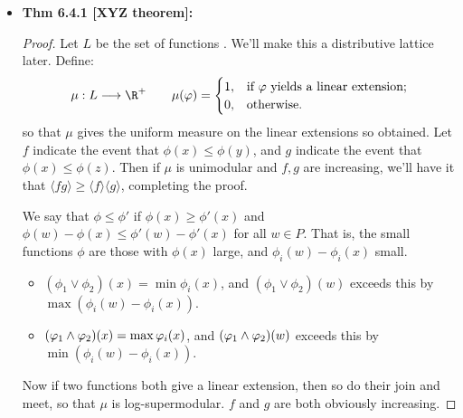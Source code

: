 \documentclass[11pt]{article}
\newenvironment{INT}[1][]{\begin{itemize}\small\item\textbf{#1}}{\end{itemize}}
\begin{document}
\begin{chapter6}
\begin{itemise}
\begin{INT}[Thm 6.4.1 {[XYZ theorem]}:]
\begin{proof}
\INDENT Let $L$ be the set of functions . We'll make this a distributive lattice later. Define:
\[\mu:L\to\R^+\qquad \mu(\phi)=\begin{cases}
1,&\textup{if $\phi$ yields a linear extension};\\
0,&\textup{otherwise}.
\end{cases}\]
so that $\mu$ gives the uniform measure on the linear extensions so obtained. Let $f$ indicate the event that $\phi(x)\leq \phi(y)$, and $g$ indicate the event that $\phi(x)\leq \phi(z)$. Then if $\mu$ is unimodular and $f,g$ are increasing, we'll have it that $\langle fg\rangle\geq\langle f\rangle\langle g\rangle$, completing the proof.

\INDENT %
We say that $\phi\leq\phi'$ if $\phi(x)\geq\phi'(x)$ and $\phi(w)-\phi(x)\leq\phi'(w)-\phi'(x)$ for all $w\in P$. That is, the small functions $\phi$ are those with $\phi(x)$ large, and $\phi_i(w)-\phi_i(x)$ small.
\begin{itemize}\squishlist
\item $(\phi_1\vee\phi_2)(x)=\min\phi_i(x)$, and $(\phi_1\vee\phi_2)(w)$ exceeds this by $\max (\phi_i(w)-\phi_i(x))$.
\item $(\varphi_1\wedge\varphi_2)(x)=\max\varphi_i(x)$, and $(\varphi_1\wedge\varphi_2)(w)$ exceeds this by $\min (\phi_i(w)-\phi_i(x))$.
\end{itemize}
Now if two functions both give a linear extension, then so do their join and meet, so that $\mu$ is log-supermodular. $f$ and $g$ are both obviously increasing.
\end{proof}
\end{INT}

\end{itemise}
\end{chapter6}
\end{document}
